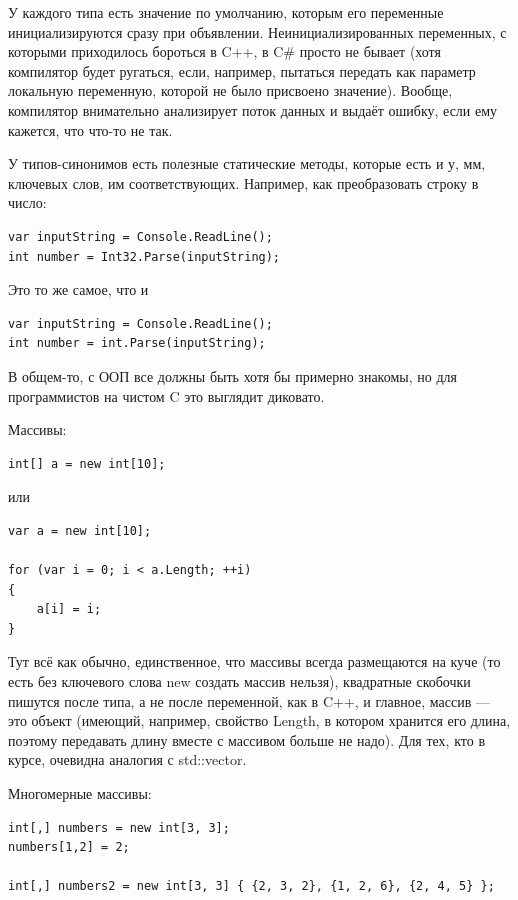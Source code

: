 \documentclass[a5paper]{article}
\begin{document}
У каждого типа есть значение по умолчанию, которым его переменные инициализируются сразу при объявлении. Неинициализированных переменных, с которыми приходилось бороться в C++, в C\# просто не бывает (хотя компилятор будет ругаться, если, например, пытаться передать как параметр локальную переменную, которой не было присвоено значение). Вообще, компилятор внимательно анализирует поток данных и выдаёт ошибку, если ему кажется, что что-то не так.

У типов-синонимов есть полезные статические методы, которые есть и у, мм, ключевых слов, им соответствующих. Например, как преобразовать строку в число:

\begin{verbatim}
var inputString = Console.ReadLine();
int number = Int32.Parse(inputString);
\end{verbatim}

Это то же самое, что и

\begin{verbatim}
var inputString = Console.ReadLine();
int number = int.Parse(inputString);
\end{verbatim}

В общем-то, с ООП все должны быть хотя бы примерно знакомы, но для программистов на чистом C это выглядит диковато.

Массивы:

\begin{verbatim}
int[] a = new int[10];
\end{verbatim}

или

\begin{verbatim}
var a = new int[10];

for (var i = 0; i < a.Length; ++i)
{
    a[i] = i;
}
\end{verbatim}

Тут всё как обычно, единственное, что массивы всегда размещаются на куче (то есть без ключевого слова new создать массив нельзя), квадратные скобочки пишутся после типа, а не после переменной, как в C++, и главное, массив --- это объект (имеющий, например, свойство Length, в котором хранится его длина, поэтому передавать длину вместе с массивом больше не надо). Для тех, кто в курсе, очевидна аналогия с std::vector.

Многомерные массивы:

\begin{verbatim}
int[,] numbers = new int[3, 3];
numbers[1,2] = 2;
 
int[,] numbers2 = new int[3, 3] { {2, 3, 2}, {1, 2, 6}, {2, 4, 5} };
\end{verbatim}
\end{document}
